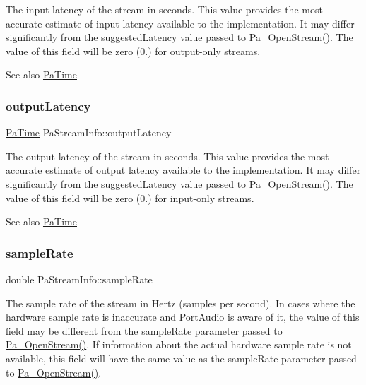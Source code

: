 The input latency of the stream in seconds. This value provides the most accurate estimate of input latency available to the implementation. It may differ significantly from the suggested\+Latency value passed to \hyperlink{portaudio_8h_a443ad16338191af364e3be988014cbbe}{Pa\+\_\+\+Open\+Stream()}. The value of this field will be zero (0.) for output-\/only streams. \begin{DoxySeeAlso}{See also}
\hyperlink{portaudio_8h_af17a7e6d0471a23071acf8dbd7bbe4bd}{Pa\+Time} 
\end{DoxySeeAlso}
\mbox{\label{struct_pa_stream_info_a372a81f39d90a85ae62225e9f57a7840}} 
\subsubsection{\texorpdfstring{output\+Latency}{outputLatency}}
{\footnotesize\ttfamily \hyperlink{portaudio_8h_af17a7e6d0471a23071acf8dbd7bbe4bd}{Pa\+Time} Pa\+Stream\+Info\+::output\+Latency}

The output latency of the stream in seconds. This value provides the most accurate estimate of output latency available to the implementation. It may differ significantly from the suggested\+Latency value passed to \hyperlink{portaudio_8h_a443ad16338191af364e3be988014cbbe}{Pa\+\_\+\+Open\+Stream()}. The value of this field will be zero (0.) for input-\/only streams. \begin{DoxySeeAlso}{See also}
\hyperlink{portaudio_8h_af17a7e6d0471a23071acf8dbd7bbe4bd}{Pa\+Time} 
\end{DoxySeeAlso}
\mbox{\label{struct_pa_stream_info_a9200fdee790d9155bc35d03be51ee2dd}} 
\subsubsection{\texorpdfstring{sample\+Rate}{sampleRate}}
{\footnotesize\ttfamily double Pa\+Stream\+Info\+::sample\+Rate}

The sample rate of the stream in Hertz (samples per second). In cases where the hardware sample rate is inaccurate and Port\+Audio is aware of it, the value of this field may be different from the sample\+Rate parameter passed to \hyperlink{portaudio_8h_a443ad16338191af364e3be988014cbbe}{Pa\+\_\+\+Open\+Stream()}. If information about the actual hardware sample rate is not available, this field will have the same value as the sample\+Rate parameter passed to \hyperlink{portaudio_8h_a443ad16338191af364e3be988014cbbe}{Pa\+\_\+\+Open\+Stream()}. \mbox{\label{struct_pa_stream_info_a5e053a3f0f6232a5d1ec0dee0f9a943b}} 
